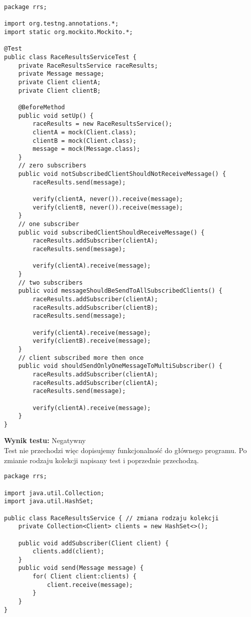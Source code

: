 \documentclass[a4paper,12pt,twoside]{article}
\begin{document}
\begin{lstlisting}
package rrs;

import org.testng.annotations.*;
import static org.mockito.Mockito.*;

@Test
public class RaceResultsServiceTest {
    private RaceResultsService raceResults;
    private Message message;
    private Client clientA;
    private Client clientB;
    
    @BeforeMethod
    public void setUp() {
        raceResults = new RaceResultsService();
        clientA = mock(Client.class);
        clientB = mock(Client.class);
        message = mock(Message.class);
    }
    // zero subscribers
    public void notSubscribedClientShouldNotReceiveMessage() {
        raceResults.send(message);
        
        verify(clientA, never()).receive(message);
        verify(clientB, never()).receive(message);
    }
    // one subscriber
    public void subscribedClientShouldReceiveMessage() {
        raceResults.addSubscriber(clientA);
        raceResults.send(message);
        
        verify(clientA).receive(message);
    }
    // two subscribers
    public void messageShouldBeSendToAllSubscribedClients() {
        raceResults.addSubscriber(clientA);
        raceResults.addSubscriber(clientB);
        raceResults.send(message);
        
        verify(clientA).receive(message);
        verify(clientB).receive(message);
    }
    // client subscribed more then once
    public void shouldSendOnlyOneMessageToMultiSubscriber() {
        raceResults.addSubscriber(clientA);
        raceResults.addSubscriber(clientA);
        raceResults.send(message);
        
        verify(clientA).receive(message);
    }
}
\end{lstlisting}

\noindent
\textbf{Wynik testu: }{\color{red} Negatywny}\\

Test nie przechodzi więc dopisujemy funkcjonalność do głównego programu.
Po zmianie rodzaju kolekcji napisany test i poprzednie przechodzą.

\begin{lstlisting}
package rrs;

import java.util.Collection;
import java.util.HashSet;

public class RaceResultsService { // zmiana rodzaju kolekcji
    private Collection<Client> clients = new HashSet<>();
    
    public void addSubscriber(Client client) {
        clients.add(client);
    }
    public void send(Message message) {
        for( Client client:clients) {
            client.receive(message);
        }
    }
}
\end{lstlisting}
\end{document}
